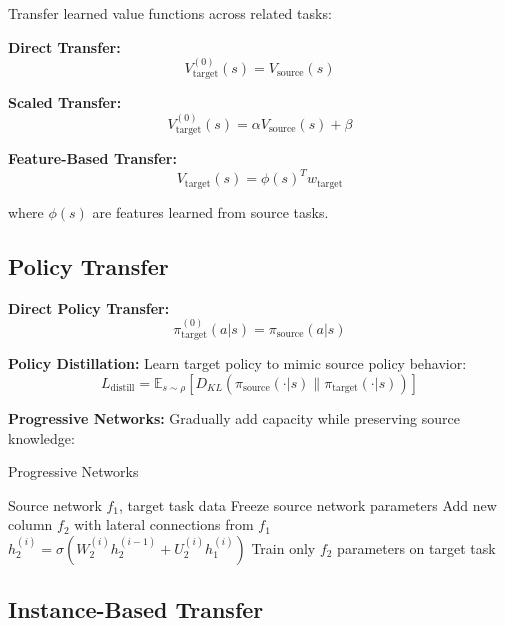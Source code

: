 Transfer learned value functions across related tasks:

\textbf{Direct Transfer:}
\begin{equation}
V_{\text{target}}^{(0)}(s) = V_{\text{source}}(s)
\end{equation}

\textbf{Scaled Transfer:}
\begin{equation}
V_{\text{target}}^{(0)}(s) = \alpha V_{\text{source}}(s) + \beta
\end{equation}

\textbf{Feature-Based Transfer:}
\begin{equation}
V_{\text{target}}(s) = \phi(s)^T w_{\text{target}}
\end{equation}

where $\phi(s)$ are features learned from source tasks.

\subsection{Policy Transfer}

\textbf{Direct Policy Transfer:}
\begin{equation}
\pi_{\text{target}}^{(0)}(a|s) = \pi_{\text{source}}(a|s)
\end{equation}

\textbf{Policy Distillation:}
Learn target policy to mimic source policy behavior:
\begin{equation}
L_{\text{distill}} = \mathbb{E}_{s \sim \rho} [D_{KL}(\pi_{\text{source}}(\cdot|s) \| \pi_{\text{target}}(\cdot|s))]
\end{equation}

\textbf{Progressive Networks:}
Gradually add capacity while preserving source knowledge:

\begin{algorithm}
\caption{Progressive Networks}
\begin{algorithmic}
\REQUIRE Source network $f_1$, target task data
\STATE Freeze source network parameters
\STATE Add new column $f_2$ with lateral connections from $f_1$
\STATE $h_2^{(i)} = \sigma(W_2^{(i)} h_2^{(i-1)} + U_2^{(i)} h_1^{(i)})$
\STATE Train only $f_2$ parameters on target task
\end{algorithmic}
\end{algorithm}

\subsection{Instance-Based Transfer}

